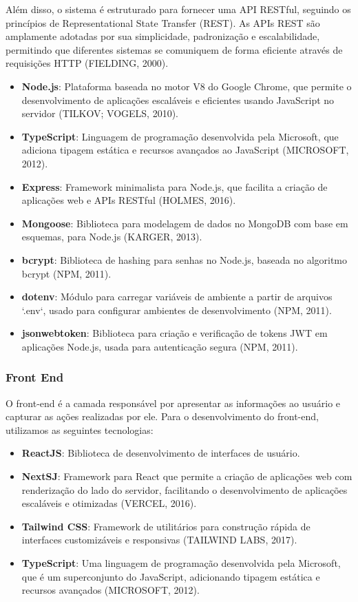 \documentclass[../main.tex]{subfiles}
\begin{document}
Além disso, o sistema é estruturado para fornecer uma API RESTful, seguindo os princípios de Representational State 
Transfer (REST). As APIs REST são amplamente adotadas por sua simplicidade, padronização e escalabilidade, permitindo 
que diferentes sistemas se comuniquem de forma eficiente através de requisições HTTP (FIELDING, 2000).

\begin{itemize}
    \item \textbf{Node.js}: Plataforma baseada no motor V8 do Google Chrome, que permite o desenvolvimento de aplicações 
        escaláveis e eficientes usando JavaScript no servidor (TILKOV; VOGELS, 2010).
    \item \textbf{TypeScript}: Linguagem de programação desenvolvida pela Microsoft, que adiciona tipagem estática e 
        recursos avançados ao JavaScript (MICROSOFT, 2012).
    \item \textbf{Express}: Framework minimalista para Node.js, que facilita a criação de aplicações web e APIs RESTful 
        (HOLMES, 2016).
    \item \textbf{Mongoose}: Biblioteca para modelagem de dados no MongoDB com base em esquemas, para Node.js 
        (KARGER, 2013).
    \item \textbf{bcrypt}: Biblioteca de hashing para senhas no Node.js, baseada no algoritmo bcrypt (NPM, 2011).
    \item \textbf{dotenv}: Módulo para carregar variáveis de ambiente a partir de arquivos `.env`, usado para 
        configurar ambientes de desenvolvimento (NPM, 2011).
    \item \textbf{jsonwebtoken}: Biblioteca para criação e verificação de tokens JWT em aplicações Node.js, 
        usada para autenticação segura (NPM, 2011).
\end{itemize}


\subsubsection{Front End}
O front-end é a camada responsável por apresentar as informações ao usuário e capturar as ações realizadas 
por ele. Para o desenvolvimento do front-end, utilizamos as seguintes tecnologias:
\begin{itemize}
    \item \textbf{ReactJS}: Biblioteca de desenvolvimento de interfaces de usuário.
    \item \textbf{NextSJ}: Framework para React que permite a criação de aplicações web com renderização do lado do servidor, 
        facilitando o desenvolvimento de aplicações escaláveis e otimizadas (VERCEL, 2016).
    \item \textbf{Tailwind CSS}: Framework de utilitários para construção rápida de interfaces customizáveis e 
    responsivas (TAILWIND LABS, 2017).
    \item \textbf{TypeScript}: Uma linguagem de programação desenvolvida pela Microsoft, que é um superconjunto do 
        JavaScript, adicionando tipagem estática e recursos avançados (MICROSOFT, 2012).
\end{itemize}
\end{document}
